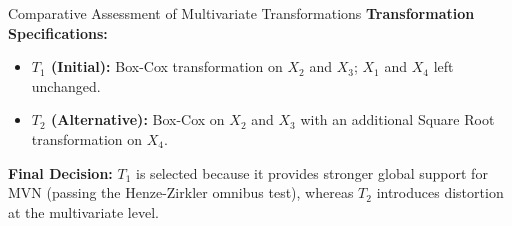 \documentclass[8pt, aspectratio=169]{beamer}
\begin{document}
\begin{frame}{Comparative Assessment of Multivariate Transformations}
    \textbf{Transformation Specifications:}
    \begin{itemize}
        \item \textbf{$T_1$ (Initial):} Box-Cox transformation on $X_2$ and $X_3$; $X_1$ and $X_4$ left unchanged.
        \item \textbf{$T_2$ (Alternative):} Box-Cox on $X_2$ and $X_3$ with an additional Square Root transformation on $X_4$.
    \end{itemize}

    \vspace{0.2cm}
    \begin{table}
        \centering
    \end{table}

    \vspace{0.4cm}
    \textbf{Final Decision:} $T_1$ is selected because it provides stronger global support for MVN (passing the Henze-Zirkler omnibus test), whereas $T_2$ introduces distortion at the multivariate level.
\end{frame}
\end{document}

